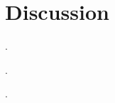 \documentclass[../Dissertation]{subfiles}
\begin{document}
\section{Discussion}\label{discussion_4}
    \lipsum[64-66] \cite{Foos_1972_PVD,
    Balazs_1982, Sebag_1987, Sebag_1989, Uchino_2001} 
    
    \lipsum[64] \cite{Kakehashi_1997, Kakehashi_2014}.  
    
    \lipsum[64] \cite{Akiba_1993}.
    
    \lipsum[64-69] \cite{Kohno_1987, Gandorfer_2001, Gandorfer_2002}.
    
    \lipsum[64-69]
\end{document}
